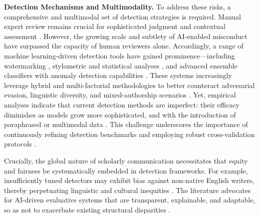 \textbf{Detection Mechanisms and Multimodality.}
To address these risks, a comprehensive and multimodal set of detection strategies is required. Manual expert review remains crucial for sophisticated judgment and contextual assessment \cite{ref2,ref23,ref82,ref86,ref97}. However, the growing scale and subtlety of AI-enabled misconduct have surpassed the capacity of human reviewers alone. Accordingly, a range of machine learning-driven detection tools have gained prominence—including watermarking \cite{ref10,ref53,ref86,ref91,ref92,ref97}, stylometric and statistical analyses \cite{ref14,ref84,ref85,ref95,ref98}, and advanced ensemble classifiers with anomaly detection capabilities \cite{ref14,ref41,ref83,ref95,ref96,ref98,ref109,ref110}. These systems increasingly leverage hybrid and multi-factorial methodologies to better counteract adversarial evasion, linguistic diversity, and mixed-authorship scenarios \cite{ref84,ref85,ref95,ref97,ref100}. Yet, empirical analyses indicate that current detection methods are imperfect: their efficacy diminishes as models grow more sophisticated, and with the introduction of paraphrased or multimodal data \cite{ref14,ref80,ref85,ref95,ref96,ref97,ref100}. This challenge underscores the importance of continuously refining detection benchmarks and employing robust cross-validation protocols \cite{ref14,ref41,ref85,ref92,ref98,ref100}.

Crucially, the global nature of scholarly communication necessitates that equity and fairness be systematically embedded in detection frameworks. For example, insufficiently tuned detectors may exhibit bias against non-native English writers, thereby perpetuating linguistic and cultural inequities \cite{ref14,ref41,ref70,ref95,ref97,ref98,ref100}. The literature advocates for AI-driven evaluative systems that are transparent, explainable, and adaptable, so as not to exacerbate existing structural disparities \cite{ref2,ref41,ref76,ref80,ref81,ref102}.

